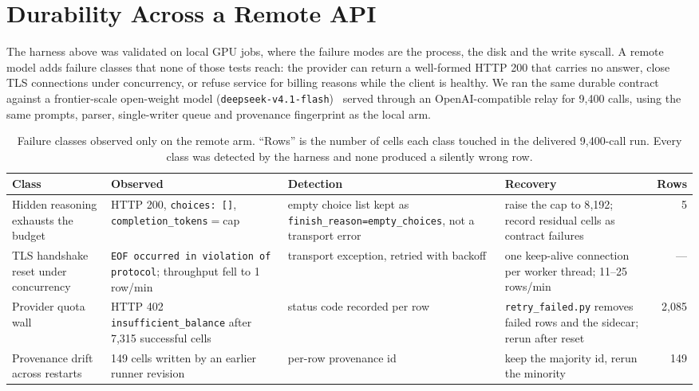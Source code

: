 \section{Durability Across a Remote API}
\label{sec:remote}

The harness above was validated on local GPU jobs, where the failure modes are the
process, the disk and the write syscall. A remote model adds failure classes that
none of those tests reach: the provider can return a well-formed HTTP 200 that
carries no answer, close TLS connections under concurrency, or refuse service for
billing reasons while the client is healthy. We ran the same durable contract
against a frontier-scale open-weight model
(\texttt{deepseek-v4.1-flash})~\citep{deepseek2026v41flash} served through an OpenAI-compatible relay for
9,400 calls, using the same prompts, parser,
single-writer queue and provenance fingerprint as the local arm.

\begin{table}[t]
\centering
\footnotesize
\setlength{\tabcolsep}{3.5pt}
\caption{Failure classes observed only on the remote arm. ``Rows'' is the number
of cells each class touched in the delivered 9,400-call run. Every class was
detected by the harness and none produced a silently wrong row.}
\label{tab:remote}
\begin{tabular}{p{}p{}p{}p{}r}
\toprule
Class & Observed & Detection & Recovery & Rows \\
\midrule
Hidden reasoning exhausts the budget & HTTP 200, \texttt{choices: []},
\texttt{completion\_tokens}\allowbreak${=}$cap & empty choice list kept as
\texttt{finish\_reason}\allowbreak\texttt{=}\allowbreak\texttt{empty\_choices},
not a transport error & raise the cap to
8{,}192; record residual cells as contract failures & 5 \\
TLS handshake reset under concurrency & \texttt{EOF occurred in violation of
protocol}; throughput fell to 1 row/min & transport exception, retried with
backoff & one keep-alive connection per worker thread; 11--25 rows/min & --- \\
Provider quota wall & HTTP 402
\texttt{insufficient\_}\allowbreak\texttt{balance} after 7,315
successful cells & status code recorded per row & \texttt{retry\_failed.py}
removes failed rows and the sidecar; rerun after reset & 2{,}085 \\
Provenance drift across restarts & 149 cells written by an earlier runner
revision & per-row provenance id & keep the majority id, rerun the minority &
149 \\
\bottomrule
\end{tabular}
\end{table}

